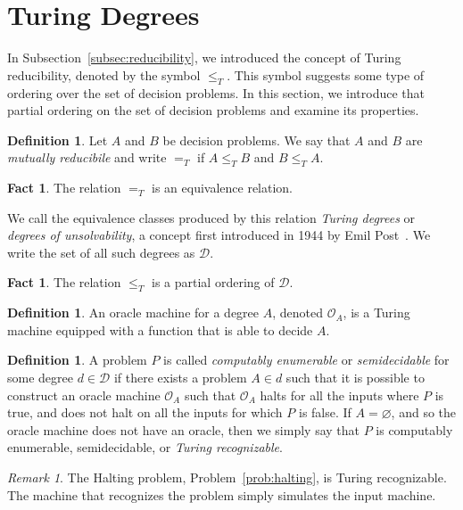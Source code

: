 \documentclass[psamsfonts]{amsart}
\theoremstyle{definition}
\newtheorem{defn}[thm]{Definition}
\newtheorem{fact}[thm]{Fact}
\theoremstyle{remark}
\newtheorem{rem}[thm]{Remark}
\numberwithin{equation}{section}
\begin{document}
\section{Turing Degrees}
In Subsection~\ref{subsec:reducibility}, we introduced the concept of
Turing reducibility, denoted by the symbol $\leq_T$. This symbol suggests some type of
ordering over the set of decision problems. In this section, we introduce that
partial ordering on the set of decision problems and examine its properties.

\begin{defn}
  Let $A$ and $B$ be decision problems. We say that $A$ and $B$ are
  \emph{mutually reducibile} and write $=_T$ if $A \leq_T B$ and $B \leq_T A$.
\end{defn}

\begin{fact}
  The relation $=_T$ is an equivalence relation.
\end{fact}

We call the equivalence classes produced by this relation \emph{Turing degrees}
or \emph{degrees of unsolvability}, a concept first introduced in
1944 by Emil Post~\cite{post44:_recur}. We write the set of all such degrees as $\mathcal{D}$.

\begin{fact}
  The relation $\leq_T$ is a partial ordering of $\mathcal{D}$.
\end{fact}

\begin{defn}
  An oracle machine for a degree $A$, denoted $\mathcal{O}_A$, is a Turing
  machine equipped with a function that is able to decide $A$.
\end{defn}

\begin{defn}
  A problem $P$ is called \emph{computably enumerable} or \emph{semidecidable}
  for some degree $d\in\mathcal{D}$ if there exists a problem $A\in d$ such that
  it is possible to construct an oracle machine $\mathcal{O}_A$ such that
  $\mathcal{O}_A$ halts for all the inputs where $P$ is true, and does not halt
  on all the inputs for which $P$ is false. If $A=\varnothing$, and so the
  oracle machine does not have an oracle, then we simply say that $P$ is
  computably enumerable, semidecidable, or \emph{Turing recognizable}.
\end{defn}
\begin{rem}
  The Halting problem, Problem~\ref{prob:halting}, is Turing recognizable. The
  machine that recognizes the problem simply simulates the input machine.
\end{rem}
\end{document}
